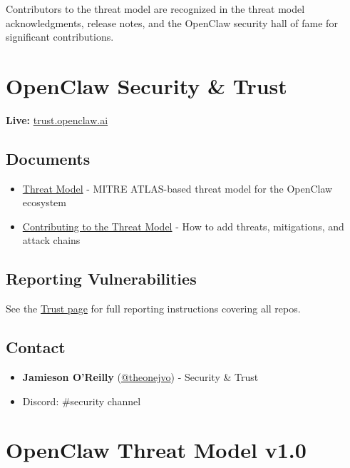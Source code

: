 Contributors to the threat model are recognized in the threat model acknowledgments, release notes, and the OpenClaw security hall of fame for significant contributions.


\clearpage

\section{OpenClaw Security \& Trust}


\textbf{Live:} \href{https://trust.openclaw.ai}{trust.openclaw.ai}

\subsection{Documents}


\begin{itemize}
  \item \href{./THREAT-MODEL-ATLAS.md}{Threat Model} - MITRE ATLAS-based threat model for the OpenClaw ecosystem
  \item \href{./CONTRIBUTING-THREAT-MODEL.md}{Contributing to the Threat Model} - How to add threats, mitigations, and attack chains
\end{itemize}


\subsection{Reporting Vulnerabilities}


See the \href{https://trust.openclaw.ai}{Trust page} for full reporting instructions covering all repos.

\subsection{Contact}


\begin{itemize}
  \item \textbf{Jamieson O'Reilly} (\href{https://twitter.com/theonejvo}{@theonejvo}) - Security \& Trust
  \item Discord: \#security channel
\end{itemize}



\clearpage

\section{OpenClaw Threat Model v1.0}


